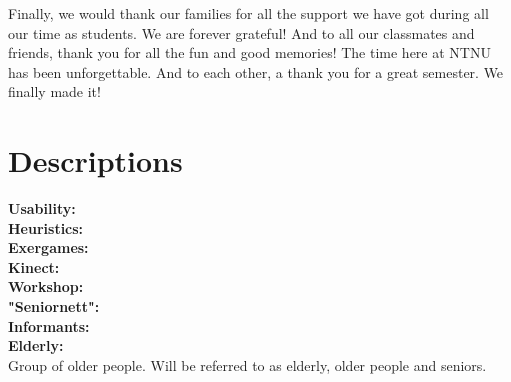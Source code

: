 \documentclass[b5paper,twoside,openright,11pt]{report}
\begin{document}
Finally, we would thank our families for all the support we have got during all our time as students. We are forever grateful! And to all our classmates and friends, thank you for all the fun and good memories! The time here at NTNU has been unforgettable. And to each other, a thank you for a great semester. We finally made it!   

\cleardoublepage
{}
\tableofcontents
\cleardoublepage

\cleardoublepage
\listoffigures
\cleardoublepage
\listoftables
\cleardoublepage
{}
\pagestyle{fancy}
\fancyhead[LE]{\thepage}
\fancyhead[RE]{\leftmark}
\fancyhead[RO]{\thepage}
\fancyhead[LO]{\rightmark}
\fancyfoot{}
\chapter*{Descriptions}
\textbf{Usability:} \\
\textbf{Heuristics:} \\ 
\textbf{Exergames:} \\
\textbf{Kinect:} \\ 
\textbf{Workshop:} \\
\textbf{"Seniornett":} \\
\textbf{Informants:} \\
\textbf{Elderly:} \\ Group of older people. Will be referred to as elderly, older people and seniors.


\cleardoublepage

\cleardoublepage

\cleardoublepage

\cleardoublepage

\cleardoublepage

\cleardoublepage

\cleardoublepage

\cleardoublepage

\cleardoublepage

\cleardoublepage

\cleardoublepage

\cleardoublepage

\cleardoublepage

\cleardoublepage


\pagestyle{plain}
\cleardoublepage
\appendix 
  
\cleardoublepage
\end{document}
